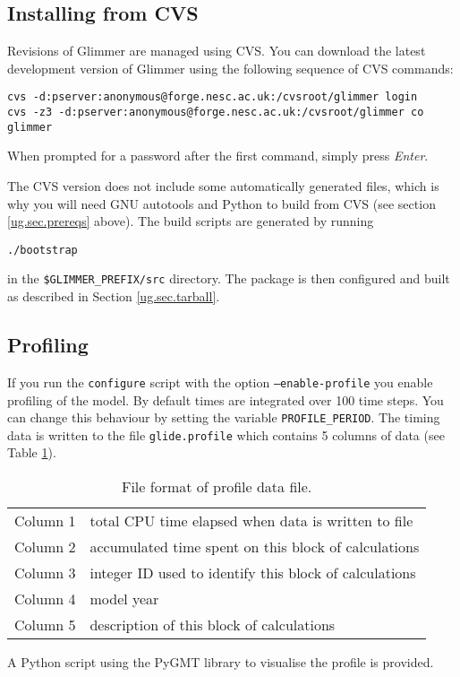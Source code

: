 \subsection{Installing from CVS}
Revisions of Glimmer are managed using CVS. You can download the
latest development version of Glimmer using the following sequence of
CVS commands: 
\begin{verbatim}
cvs -d:pserver:anonymous@forge.nesc.ac.uk:/cvsroot/glimmer login
cvs -z3 -d:pserver:anonymous@forge.nesc.ac.uk:/cvsroot/glimmer co glimmer
\end{verbatim} %
When prompted for a password after the first command, simply press
{\it Enter}.

The CVS version does not include some automatically generated
files, which is why you will need GNU autotools and Python to build
from CVS (see section \ref{ug.sec.prereqs} above). The build scripts are
generated by running
%
\begin{verbatim}
./bootstrap
\end{verbatim}
%
in the \texttt{\$GLIMMER\_PREFIX/src} directory. The package is then
configured and built as described in Section \ref{ug.sec.tarball}.
%
\subsection{Profiling}\label{ug.sec.profile}
If you run the \texttt{configure} script with the option
\texttt{--enable-profile} you enable profiling of the model. By
default times are integrated over 100 time steps. You can change this
behaviour by setting the variable \texttt{PROFILE\_PERIOD}. The timing
data is written to the file \texttt{glide.profile} which contains 5
columns of data (see Table \ref{ug.tab.profile_format}).
\begin{table}[htbp]
  \centering
  \begin{tabular}{|l|l|}
    \hline
    Column 1 &total CPU time elapsed when data is written to file\\
    Column 2 &accumulated time spent on this block of calculations\\
    Column 3 &integer ID used to identify this block of calculations\\
    Column 4 &model year\\
    Column 5 &description of this block of calculations\\
    \hline
  \end{tabular}
  \caption{File format of profile data file.}
  \label{ug.tab.profile_format}
\end{table}
A Python script using the PyGMT library to visualise the profile is provided.
%
